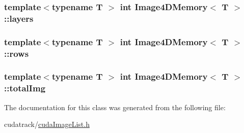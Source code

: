 \subsubsection[{\texorpdfstring{layers}{layers}}]{\setlength{\rightskip}{0pt plus 5cm}template$<$typename T $>$ int {\bf Image4\+D\+Memory}$<$ T $>$\+::layers}\hypertarget{class_image4_d_memory_ae22395a1589f6a9422698fb98aa9246a}{}\label{class_image4_d_memory_ae22395a1589f6a9422698fb98aa9246a}
\subsubsection[{\texorpdfstring{rows}{rows}}]{\setlength{\rightskip}{0pt plus 5cm}template$<$typename T $>$ int {\bf Image4\+D\+Memory}$<$ T $>$\+::rows}\hypertarget{class_image4_d_memory_af556b18c289647e31907875c19c13fd3}{}\label{class_image4_d_memory_af556b18c289647e31907875c19c13fd3}
\subsubsection[{\texorpdfstring{total\+Img}{totalImg}}]{\setlength{\rightskip}{0pt plus 5cm}template$<$typename T $>$ int {\bf Image4\+D\+Memory}$<$ T $>$\+::total\+Img}\hypertarget{class_image4_d_memory_a5e3ce6717ffeaa4eb544df248a7334b1}{}\label{class_image4_d_memory_a5e3ce6717ffeaa4eb544df248a7334b1}


The documentation for this class was generated from the following file\+:\begin{DoxyCompactItemize}
\item 
cudatrack/\hyperlink{cuda_image_list_8h}{cuda\+Image\+List.\+h}\end{DoxyCompactItemize}
